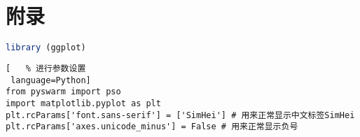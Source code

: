 \pagestyle{append}
\section*{附录}

\begin{lstlisting}[language=R]
library (ggplot)

\end{lstlisting} 

\begin{lstlisting}[   % 进行参数设置
 language=Python]
from pyswarm import pso
import matplotlib.pyplot as plt
plt.rcParams['font.sans-serif'] = ['SimHei'] # 用来正常显示中文标签SimHei
plt.rcParams['axes.unicode_minus'] = False # 用来正常显示负号
\end{lstlisting}
